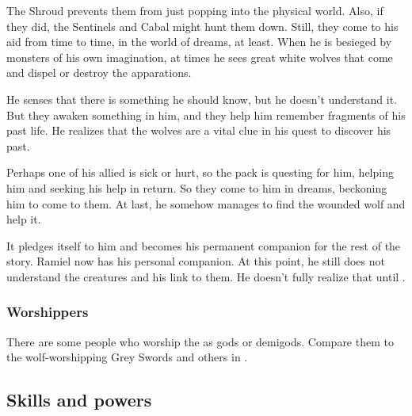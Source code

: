 The Shroud prevents them from just popping into the physical world. Also, if they did, the Sentinels and Cabal might hunt them down. Still, they come to his aid from time to time, in the world of dreams, at least. When he is besieged by monsters of his own imagination, at times he sees great white wolves that come and dispel or destroy the apparations. 

He senses that there is something he should know, but he doesn't understand it. But they awaken something in him, and they help him remember fragments of his past life. He realizes that the wolves are a vital clue in his quest to discover his past.

Perhaps one of his allied \moonwolves{} is sick or hurt, so the pack is questing for him, helping him and seeking his help in return. So they come to him in dreams, beckoning him to come to them. At last, he somehow manages to find the wounded wolf and help it. 

It pledges itself to him and becomes his permanent companion for the rest of the story. Ramiel now has his personal \moonwolf{} companion. At this point, he still does not understand the creatures and his link to them. He doesn't fully realize that until . 





\subsubsection{Worshippers}
There are some people who worship the \moonwolves{} as gods or demigods. Compare them to the wolf-worshipping Grey Swords and others in \cite{StevenEriksonIanCameronEsslemont:MalazanBookoftheFallen}.










\subsection{Skills and powers}





